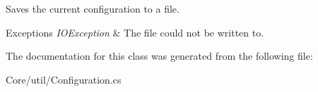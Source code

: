 Saves the current configuration to a file.


\begin{DoxyExceptions}{Exceptions}
{\em I\-O\-Exception} & The file could not be written to.\\
\hline
\end{DoxyExceptions}


The documentation for this class was generated from the following file\-:\begin{DoxyCompactItemize}
\item 
Core/util/Configuration.\-cs\end{DoxyCompactItemize}
